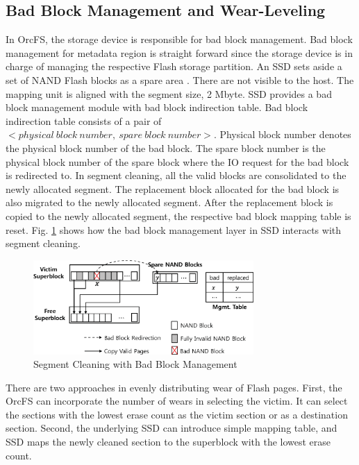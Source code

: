 \documentclass[pageno]{jpaper}
\begin{document}
\subsection{Bad Block Management and Wear-Leveling}
\label{subsec:bad_block_management}

In OrcFS, the storage device is responsible for bad block
management. Bad block management for metadata region is straight
forward since the storage device is in charge of managing the
respective Flash storage partition.  An SSD sets aside a set of NAND
Flash blocks as a spare area \cite{chow2007managing}. There are not
visible to the host.  The mapping unit is aligned with the segment
size, 2 Mbyte.  SSD provides a bad block management module with bad
block indirection table. Bad block indirection table consists of a
pair of $<physical~ block~ number, ~spare~ block~ number>$. Physical
block number denotes the physical block number of the bad block. The
spare block number is the physical block number of the spare block
where the IO request for the bad block is redirected to. In segment
cleaning, all the valid blocks are consolidated to the newly allocated
segment. The replacement block allocated for the bad block is also
migrated to the newly allocated segment. After the replacement block
is copied to the newly allocated segment, the respective bad block
mapping table is reset.  Fig. \ref{fig:bad_block} shows how the bad
block management layer in SSD interacts with segment cleaning.


\begin{figure}[t]
\begin{center}
\includegraphics[width=3.3in]{./figure/bad_block_management}
\caption{Segment Cleaning with Bad Block Management}
\label{fig:bad_block}
\end{center}
\end{figure}

There are two approaches in evenly distributing wear of Flash
pages. First, the OrcFS can incorporate the number of wears in
selecting the victim. It can select the sections with the lowest erase
count as the victim section or as a destination section. Second,
the underlying SSD can introduce simple mapping table, and SSD maps the
newly cleaned section to the superblock with the lowest erase count.
\end{document}
